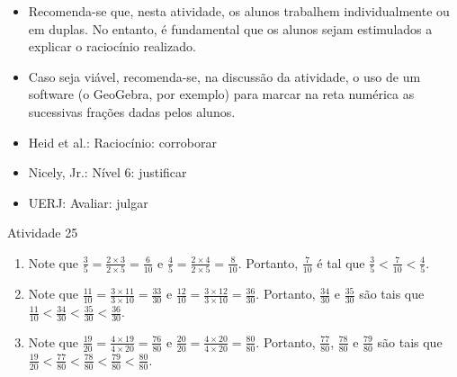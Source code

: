 
\begin{itemize} %
    \item       Recomenda-se que, nesta atividade, os alunos trabalhem
individualmente ou em duplas. No entanto, é fundamental que os alunos sejam
estimulados a explicar o raciocínio realizado.
    \item       Caso seja viável, recomenda-se, na discussão da atividade, o uso
de um software (o GeoGebra, por exemplo) para marcar na reta numérica as
sucessivas frações dadas pelos alunos.
\end{itemize} %


   \vspace{.1cm}

 \vspace{.1cm}

\begin{itemize} %
    \item       Heid et al.: Raciocínio: corroborar
    \item       Nicely, Jr.: Nível 6: justificar
    \item       UERJ: Avaliar: julgar
\end{itemize} %

\begin{resposta*}{Atividade 25}
\begin{enumerate} [\quad a)] %
    \item       Note que       $\frac{3}{5} = \frac{2 \times 3}{2 \times 5} =
\frac{6}{10}$       e       $\frac{4}{5} = \frac{2 \times 4}{2 \times 5} =
\frac{8}{10}$. Portanto,       $\frac{7}{10}$       é tal que       $\frac{3}{5}
< \frac{7}{10} < \frac{4}{5}$.
    \item       Note que       $\frac{11}{10} = \frac{3 \times 11}{3 \times 10}
= \frac{33}{30}$       e       $\frac{12}{10} = \frac{3 \times 12}{3 \times 10}
= \frac{36}{30}$. Portanto,       $\frac{34}{30}$       e       $\frac{35}{30}$
     são tais que       $\frac{11}{10} < \frac{34}{30} < \frac{35}{30} <
\frac{36}{30}$.
    \item       Note que       $\frac{19}{20} = \frac{4 \times 19}{4 \times 20}
= \frac{76}{80}$       e       $\frac{20}{20} = \frac{4 \times 20}{4 \times 20}
= \frac{80}{80}$. Portanto,       $\frac{77}{80}$,       $\frac{78}{80}$       e
      $\frac{79}{80}$       são tais que       $\frac{19}{20} < \frac{77}{80} <
\frac{78}{80} < \frac{79}{80} < \frac{80}{80}$.
\end{enumerate} %

\end{resposta*}
\Bg
\Bg


